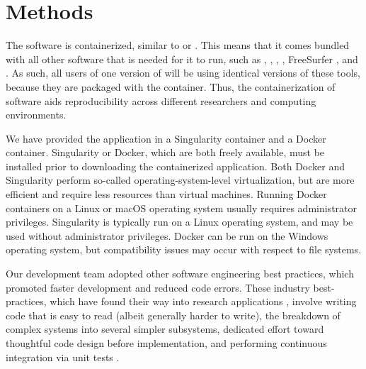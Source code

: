 \section{Methods}

The  software is containerized, similar to  or . This means that it comes bundled with all other software that is needed for it to run, such as  \parencite{esteban2019a},  \parencite{esteban2017},  \parencite{jenkinson2012},  \parencite{avants2011}, FreeSurfer \parencite{fischl2000}, and  \parencite{cox1996,cox1997}. As such, all users of one version of  will be using identical versions of these tools, because they are packaged with the container. Thus, the containerization of  software aids reproducibility across different researchers and computing environments.

We have provided the  application in a Singularity container and a Docker container. Singularity or Docker, which are both freely available, must be installed prior to downloading the containerized  application. Both Docker and Singularity perform so-called operating-system-level virtualization, but are more efficient and require less resources than virtual machines. Running Docker containers on a Linux or macOS operating system usually requires administrator privileges. Singularity is typically run on a Linux operating system, and may be used without administrator privileges. Docker can be run on the Windows operating system, but compatibility issues may occur with respect to file systems.

Our  development team adopted other software engineering best practices, which promoted faster development and reduced code errors. These industry best-practices, which have found their way into research applications \parencite{das2018}, involve writing code that is easy to read (albeit generally harder to write), the breakdown of complex systems into several simpler subsystems, dedicated effort toward thoughtful code design before implementation, and performing continuous integration via unit tests \parencite{beck2000}.











%








